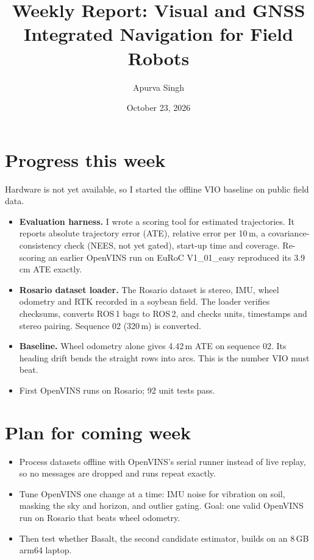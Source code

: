 \documentclass[12pt,reqno]{amsart}
\title{Weekly Report: Visual and GNSS Integrated Navigation for Field Robots}
\author{Apurva Singh}
\date{October 23, 2026}
\theoremstyle{plain}
\begin{document}
\maketitle

\section*{Progress this week}

Hardware is not yet available, so I started the offline VIO baseline on public field data.
\begin{itemize}
\item \textbf{Evaluation harness.} I wrote a scoring tool for estimated trajectories. It reports
absolute trajectory error (ATE), relative error per 10\,m, a covariance-consistency check (NEES,
not yet gated), start-up time and coverage. Re-scoring an earlier OpenVINS run on EuRoC
V1\_01\_easy reproduced its 3.9\,cm ATE exactly.
\item \textbf{Rosario dataset loader.} The Rosario dataset is stereo, IMU, wheel odometry and RTK
recorded in a soybean field. The loader verifies checksums, converts ROS\,1 bags to ROS\,2, and
checks units, timestamps and stereo pairing. Sequence 02 (320\,m) is converted.
\item \textbf{Baseline.} Wheel odometry alone gives 4.42\,m ATE on sequence 02. Its heading drift
bends the straight rows into arcs. This is the number VIO must beat.
\item First OpenVINS runs on Rosario; 92 unit tests pass.
\end{itemize}

\section*{Plan for coming week}
\begin{itemize}
\item Process datasets offline with OpenVINS's serial runner instead of live replay, so no
messages are dropped and runs repeat exactly.
\item Tune OpenVINS one change at a time: IMU noise for vibration on soil, masking the sky and
horizon, and outlier gating. Goal: one valid OpenVINS run on Rosario that beats wheel odometry.
\item Then test whether Basalt, the second candidate estimator, builds on an 8\,GB arm64 laptop.
\end{itemize}
\end{document}
